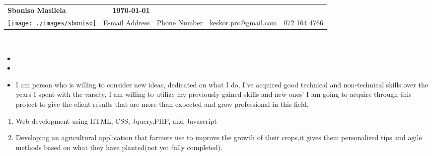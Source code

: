 %
\\ \\

\begin{tabular*}{6.5in}{l@{\extracolsep{\fill}}r}
\textbf{\Large } \textbf{Sboniso Masilela} & \textbf{\today} \\
\texttt{[image: ./images/sboniso]} & E-mail
Address & Phone Number & {\color{green}keskor.pro@gmail.com} & {\color{green}072 164 4766}
\end{tabular*}
\\

\begin{itemize}

\item {}

\item {}

\end{itemize}


\begin{itemize}
 \item %
 I am person who is willing to consider new ideas, dedicated on what I do, I've acquired good technical and non-technical skills
 over the years I spent with the varsity, I am willing to utilize my previously gained skills and new ones' I am going to acquire through
 this project to give the client results that are more than expected and grow professional in this field.
\end{itemize}



\begin{enumerate}
 \item Web development using HTML, CSS, Jquery,PHP, and Javascript 
 \item Developing an agricultural application that farmers use to improve the growth of their crops,it gives them personalized tips
 and agile methods based on what they have planted(not yet fully completed).

\end{enumerate}

